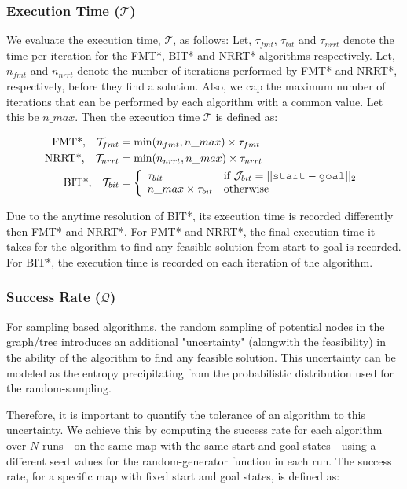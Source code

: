 \documentclass{article}
\newcommand*{\varfont}{\fontfamily{pcr}\selectfont}
\begin{document}
\subsubsection{Execution Time ($\mathcal{T}$)}

We evaluate the execution time, $\mathcal{T}$,  as follows: Let, $\tau_{fmt}$, $\tau_{bit}$ and $\tau_{nrrt}$ denote the time-per-iteration for the FMT*, BIT* and NRRT* algorithms respectively. Let, $n_{fmt}$ and $n_{nrrt}$ denote the number of iterations performed by FMT* and NRRT*, respectively, before they find a solution. Also, we cap the maximum number of iterations that can be performed by each algorithm with a common value. Let this be $n\_max$. Then the execution time $\mathcal{T}$ is defined as:

\begin{align}
	\text{FMT*,} \quad \mathcal{T}_{fmt} &= \min(n_{fmt}, n\_max) \times \tau_{fmt} \\
	\text{NRRT*,} \quad \mathcal{T}_{nrrt} &= \min(n_{nrrt}, n\_max) \times \tau_{nrrt} \\
	\text{BIT*,} \quad \mathcal{T}_{bit} &= 
	\left\{
		\begin{array}{ll}
			\tau_{bit}  & \mbox{if } \mathcal{J}_{bit} = ||\text{\varfont start} - \text{\varfont goal}||_2\\
			n\_max \times \tau_{bit} & \mbox{otherwise} 
		\end{array}
	\right.
\end{align}

Due to the anytime resolution of BIT*, its execution time is recorded differently then FMT* and NRRT*. For FMT* and NRRT*, the final execution time it takes for the algorithm to find any feasible solution from {\varfont start} to {\varfont goal} is recorded. For BIT*, the execution time is recorded on each iteration of the algorithm.

\subsubsection{Success Rate ($\mathcal{Q}$)}

For sampling based algorithms, the random sampling of potential nodes in the graph/tree introduces an additional "uncertainty" (alongwith the feasibility) in the ability of the algorithm to find any feasible solution. This uncertainty can be modeled as the entropy precipitating from the probabilistic distribution used for the random-sampling.

Therefore, it is important to quantify the tolerance of an algorithm to this uncertainty. We achieve this by computing the success rate for each algorithm over $N$ runs - on the same map with the same {\varfont start} and {\varfont goal} states - using a different seed values for the random-generator function in each run. The success rate, for a specific map with fixed {\varfont start} and {\varfont goal} states, is defined as:
\end{document}
